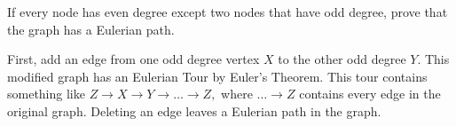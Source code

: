 \question If every node has even degree except two nodes that 
have odd degree, prove that the graph has a Eulerian path.

\begin{solution}
First, add an edge from one odd degree vertex $X$ to the other 
odd degree $Y$. This modified graph has an Eulerian Tour by Euler’s 
Theorem. This tour contains something like $Z \rightarrow X \rightarrow 
Y \rightarrow \dotsc \rightarrow Z,$ where $\dotsc \rightarrow Z$ 
contains every edge in the original graph. Deleting an edge leaves a 
Eulerian path in the graph. 
\end{solution}

\clearpage
